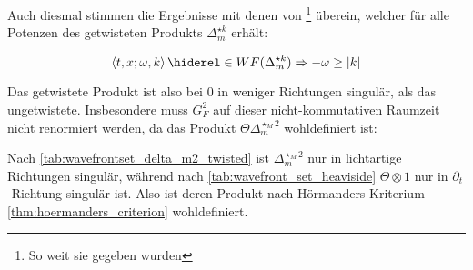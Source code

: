 Auch diesmal stimmen die Ergebnisse mit denen von \textcite[Prop. 3.72]{Schulz2014}\footnote{So weit sie gegeben wurden} überein, welcher für alle Potenzen des getwisteten Produkts $\Delta_m^{\star k}$ erhält:

\begin{equation*}
\left\langle t,x; \omega, k \right\rangle \hiderel\in WF(\Delta_m^{\star k})
\Rightarrow
- \omega \geq |k|
\end{equation*}

Das getwistete Produkt ist also bei $0$ in weniger Richtungen singulär, als das ungetwistete. Insbesondere muss $G_F^2$ auf dieser nicht-kommutativen Raumzeit nicht renormiert werden, da das Produkt $\Theta \Delta_m^{\star_M 2}$ wohldefiniert ist:

\begin{corollary}
Nach \cref{tab:wavefrontset_delta_m2_twisted} ist $\Delta_m^{\star_M 2}$ nur in lichtartige Richtungen singulär, während nach \cref{tab:wavefront_set_heaviside} $\Theta\otimes 1$ nur in $\partial_t$-Richtung singulär ist. Also ist deren Produkt nach Hörmanders Kriterium \cref{thm:hoermanders_criterion} wohldefiniert.
\end{corollary}



